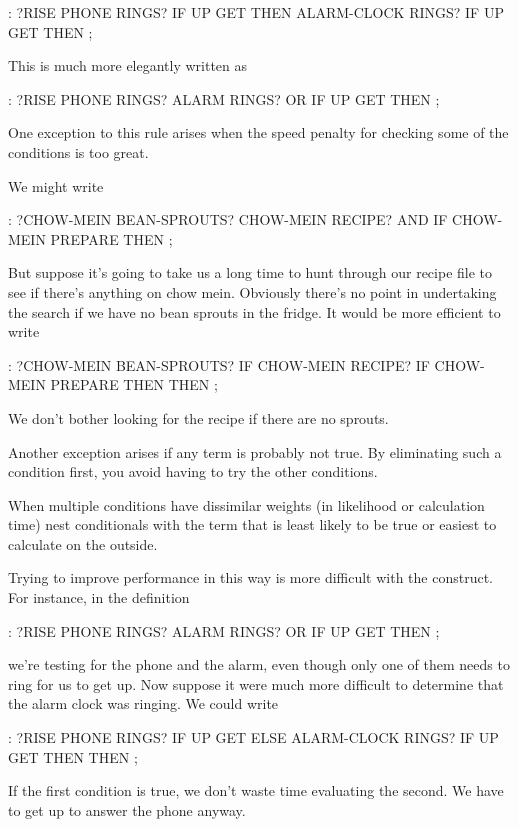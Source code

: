 \begin{Code}
: ?RISE    PHONE RINGS? IF  UP GET  THEN
     ALARM-CLOCK RINGS?  IF UP GET THEN ;
\end{Code}
This is much more elegantly written as

\begin{Code}
: ?RISE  PHONE RINGS?  ALARM RINGS? OR  IF  UP GET THEN ;
\end{Code}
One exception to this rule arises when the speed penalty for checking
some of the conditions is too great.

We might write

\begin{Code}
: ?CHOW-MEIN   BEAN-SPROUTS?  CHOW-MEIN RECIPE?  AND IF
   CHOW-MEIN PREPARE  THEN ;
\end{Code}
But suppose it's going to take us a long time to hunt through our recipe
file to see if there's anything on chow mein. Obviously there's no point in
undertaking the search if we have no bean sprouts in the fridge. It would
be more efficient to write

\begin{Code}
: ?CHOW-MEIN   BEAN-SPROUTS? IF  CHOW-MEIN RECIPE? IF
   CHOW-MEIN PREPARE THEN   THEN ;
\end{Code}
We don't bother looking for the recipe if there are no sprouts.

Another exception arises if any term is probably not true. By
eliminating such a condition first, you avoid having to try the other
conditions.

\begin{tip}
When multiple conditions have dissimilar weights (in likelihood or
calculation time) nest conditionals with the term that is least likely
to be true or easiest to calculate on the outside.
\end{tip}
Trying to improve performance in this way is more difficult with the
 construct. For instance, in the definition

\begin{Code}
: ?RISE  PHONE RINGS?  ALARM RINGS? OR  IF  UP GET THEN ;
\end{Code}
we're testing for the phone and the alarm, even though only one of them
needs to ring for us to get up. Now suppose it were much more difficult to
determine that the alarm clock was ringing. We could write

\begin{Code}
: ?RISE   PHONE RINGS? IF  UP GET  ELSE
     ALARM-CLOCK RINGS?  IF UP GET THEN THEN  ;
\end{Code}
If the first condition is true, we don't waste time evaluating the second.
We have to get up to answer the phone anyway.

